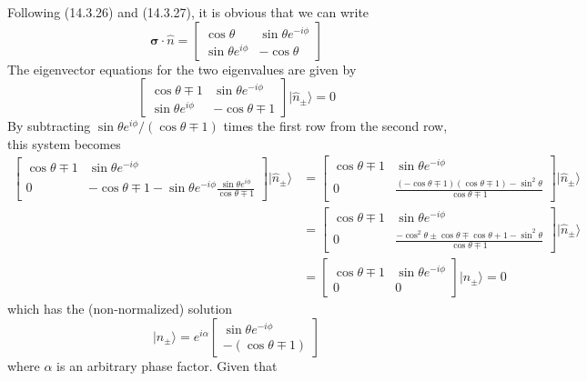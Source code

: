 \documentclass[../principles-of-quantum-mechanics.tex]{subfiles}
\begin{document}
\begin{questions}
		\begin{solution}
			Following (14.3.26) and (14.3.27), it is obvious that we can write
			$$\boldsymbol{\sigma}\cdot\hat{n} = \begin{bmatrix}
				\cos\theta & \sin\theta e^{-i\phi} \\
				\sin\theta e^{i\phi} & -\cos\theta
			\end{bmatrix}$$
			The eigenvector equations for the two eigenvalues are given by
			$$\begin{bmatrix}
				\cos\theta \mp 1 & \sin\theta e^{-i\phi} \\
				\sin\theta e^{i\phi} & -\cos\theta \mp 1
			\end{bmatrix}|\hat{n}_\pm\rangle = 0$$
			By subtracting $\sin\theta e^{i\phi}/(\cos\theta \mp 1)$ times the first row from the second row, this system becomes
			\begin{align*}
				\begin{bmatrix}
					\cos\theta \mp 1 & \sin\theta e^{-i\phi} \\
					 0 & -\cos\theta \mp 1 - \sin\theta e^{-i\phi}\frac{\sin\theta e^{i\phi}}{\cos\theta \mp 1}
				\end{bmatrix}|\hat{n}_\pm\rangle &= \begin{bmatrix}
				\cos\theta \mp 1 & \sin\theta e^{-i\phi} \\
				0 & \frac{(-\cos\theta \mp 1)(\cos\theta \mp 1) - \sin^2\theta}{\cos\theta \mp 1}
			\end{bmatrix}|\hat{n}_\pm\rangle \\
			&= \begin{bmatrix}
				\cos\theta \mp 1 & \sin\theta e^{-i\phi} \\
				0 & \frac{-\cos^2\theta \pm \cos\theta \mp \cos\theta + 1 - \sin^2\theta}{\cos\theta \mp 1}
			\end{bmatrix}|\hat{n}_\pm\rangle \\
			&= \begin{bmatrix}
				\cos\theta \mp 1 & \sin\theta e^{-i\phi} \\
				0 & 0
			\end{bmatrix}|\hat{n}_\pm\rangle = 0
			\end{align*}
			which has the (non-normalized) solution
			$$|\hat{n}_\pm\rangle = e^{i\alpha}\begin{bmatrix}
				\sin\theta e^{-i\phi} \\
				-(\cos\theta \mp 1)
			\end{bmatrix}$$
			where $\alpha$ is an arbitrary phase factor. Given that

\end{solution}
\end{questions}
\end{document}
